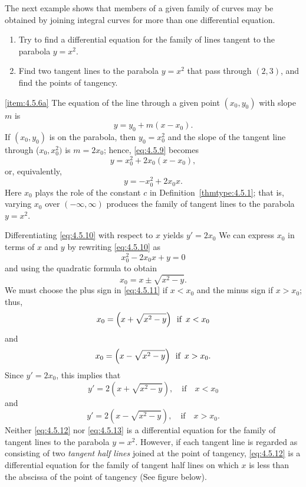 \documentclass{ximera}
\begin{document}
The next example shows that members of a given family of curves
may be obtained by joining  integral curves for more than one
differential equation.

\begin{example}\label{example:4.5.6} 

\begin{enumerate}
\item\label{item:4.5.6a} %
Try to find a differential equation for the family of lines tangent
to the parabola $y=x^2$.

\item\label{item:4.5.6b} %
Find two tangent lines to  the parabola $y=x^2$ that pass
through $(2,3)$, and find the points of tangency.
\end{enumerate}


\begin{explanation} \ref{item:4.5.6a} The equation of the line through a given point
$(x_0,y_0)$ with slope $m$ is
\begin{equation}  \label{eq:4.5.9}
y=y_0+m(x-x_0).
\end{equation}
If $(x_0,y_0)$ is on the parabola, then $y_0=x_0^2$ and the slope of
the tangent line through ($x_0,x_0^2)$ is $m=2x_0$; hence,
\eqref{eq:4.5.9} becomes
$$
y=x_0^2+2x_0(x-x_0),
$$
 or, equivalently,
\begin{equation} \label{eq:4.5.10}
y=-x_0^2+2x_0x.
\end{equation}
Here $x_0$ plays the role of the constant $c$ in
Definition~\ref{thmtype:4.5.1}; that is, varying $x_0$ over
$(-\infty,\infty)$ produces the family of tangent lines to the
parabola $y=x^2$.


Differentiating \eqref{eq:4.5.10} with respect to $x$ yields
$y'=2x_0$
We can express $x_0$ in terms of $x$ and $y$ by rewriting
\eqref{eq:4.5.10} as
$$
x_0^2-2x_0x+y=0
$$
and using the quadratic formula to obtain
 \begin{equation}\label{eq:4.5.11}
 x_0=x\pm\sqrt{x^2-y}.
\end{equation}
We must choose the plus sign in \eqref{eq:4.5.11} if $x<x_0$
and the minus sign if $x>x_0$;   thus,
$$
x_0=\left(x+\sqrt{x^2-y}\right)\mbox{\, if \,} x<x_0
$$
 and
$$
x_0=\left(x-\sqrt{x^2-y}\right)\mbox{\, if \,} x>x_0.
$$
Since $y'=2x_0$, this implies that
\begin{equation} \label{eq:4.5.12}
y'=2\left(x+\sqrt{x^2-y}\right),\quad\mbox{if}\quad x<x_0
\end{equation}
 and
\begin{equation} \label{eq:4.5.13}
y'=2\left(x-\sqrt{x^2-y}\right),\quad \mbox{if}\quad x>x_0.
\end{equation}
Neither \eqref{eq:4.5.12} nor \eqref{eq:4.5.13} is a differential equation for
the family of tangent lines to the parabola $y=x^2$. However, if each
tangent line is regarded as consisting of two \textit{tangent half
lines} joined at the point of tangency,   \eqref{eq:4.5.12} is a
differential equation for the family of tangent half lines on which
$x$ is less than the abscissa of the point of tangency
(See figure below).


\end{explanation}
\end{example}
\end{document}

